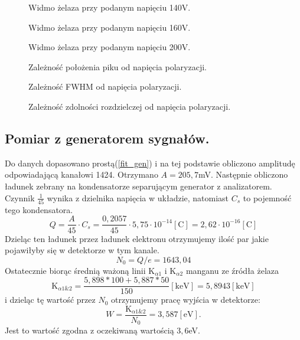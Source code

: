 \documentclass[11pt,a4paper]{article}
\begin{document}
\begin{figure}[H]
\centering
\resizebox{.8\linewidth}{!}{}
\caption{Widmo żelaza przy podanym napięciu 140V.}
\label{fig1}
\end{figure}

\begin{figure}[H]
\centering
\resizebox{.8\linewidth}{!}{}
\caption{Widmo żelaza przy podanym napięciu 160V.}
\label{fig1}
\end{figure}

\begin{figure}[H]
\centering
\resizebox{.8\linewidth}{!}{}
\caption{Widmo żelaza przy podanym napięciu 200V.}
\label{fig1}
\end{figure}

\begin{figure}[H]
\centering
\resizebox{.8\linewidth}{!}{}
\caption{Zależność położenia piku od napięcia polaryzacji.}
\label{fig1}
\end{figure}

\begin{figure}[H]
\centering
\resizebox{.8\linewidth}{!}{}
\caption{Zależność FWHM od napięcia polaryzacji.}
\label{fig1}
\end{figure}

\begin{figure}[H]
\centering
\resizebox{.8\linewidth}{!}{}
\caption{Zależność zdolności rozdzielczej od napięcia polaryzacji.}
\label{fig1}
\end{figure}

\subsection{Pomiar z generatorem sygnałów.}
Do danych dopasowano prostą(\ref{fit_gen}) i na tej podstawie obliczono amplitudę odpowiadającą kanałowi 1424. 
Otrzymano $A = 205,7$mV.
Następnie obliczono ładunek zebrany na kondensatorze separującym generator z analizatorem. 
Czynnik $\frac{1}{45}$ wynika z dzielnika napięcia w układzie, natomiast $C_s$ to pojemność tego kondensatora.
$$
Q=\frac{A}{45} \cdot C_s = \frac{0,2057}{45}\cdot 5,75\cdot 10^{-14} [\text{C}] = 2,62\cdot 10^{-16} [\text{C}]
$$
Dzieląc ten ładunek przez ładunek elektronu otrzymujemy ilość par jakie pojawiłyby się w detektorze w tym kanale.
$$
N_0 = Q/e = 1643,04
$$
Ostatecznie biorąc średnią ważoną linii K$_{\alpha 1}$ i K$_{\alpha 2}$ manganu ze źródła żelaza
$$
\text{K}_{\alpha 1\&2} = \frac{5,898*100 + 5,887*50}{150} [\text{keV}]=5,8943 [\text{keV}]
$$
i dzieląc tę wartość przez $N_0$ otrzymujemy pracę wyjścia w detektorze:
\begin{equation}
	W = \frac{\text{K}_{\alpha 1\&2}}{N_0} = 3,587 [\text{eV}].
\end{equation}
Jest to wartość zgodna z oczekiwaną wartością $3,6$eV.
\end{document}
